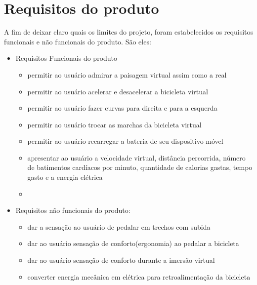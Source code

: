 \chapter[Requisitos do produto]{Requisitos do produto}

A fim de deixar claro quais os limites do projeto, foram estabelecidos os requisitos funcionais e não funcionais do produto. São eles:
\begin{itemize}
	\item Requisitos Funcionais do produto
		\begin{itemize}
		\item permitir ao usuário admirar a paisagem virtual assim como a real
		\item permitir ao usuário acelerar e desacelerar a bicicleta virtual
		\item permitir ao usuário fazer curvas para direita e para a esquerda
		\item permitir ao usuário trocar as marchas da bicicleta virtual
		\item permitir ao usuário recarregar a bateria de seu dispositivo móvel
		\item apresentar ao usuário a velocidade virtual, distância percorrida, número de batimentos cardíacos por minuto, quantidade de calorias gastas, tempo gasto e a energia elétrica
		\item 
		\end{itemize}
	\item Requisitos não funcionais do produto:
		\begin{itemize}
		\item dar a sensação ao usuário de pedalar em trechos com subida
		\item dar ao usuário sensação de conforto(ergonomia) ao pedalar a bicicleta
		\item dar ao usuário sensação de conforto durante a imersão virtual
		\item converter energia mecânica em elétrica para retroalimentação da bicicleta
		\end{itemize}
\end{itemize}
